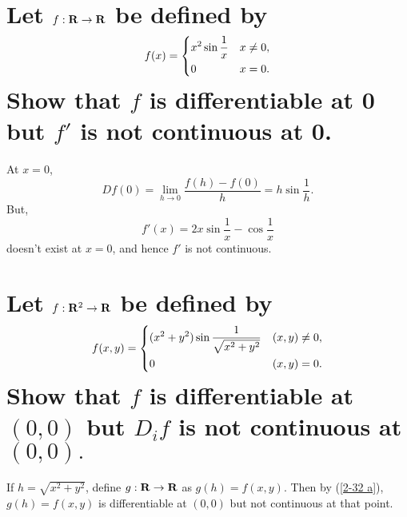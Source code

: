 \question{
    [2-32]
}
\begin{parts}
    \part{
        \label{2-32 a}
        Let $f:\mathbf{R}\to\mathbf{R}$ be defined by
        $$f(x)=
        \begin{dcases}
            x^2\sin{\frac{1}{x}}
                &x\ne 0,\\
            0&x=0.
        \end{dcases}$$
        Show that $f$ is differentiable
        at 0 but $f'$ is not continuous
        at 0. 
    }
    \begin{solution}
    At $x=0$,
    $$Df(0)=\lim_{h\to 0}{\frac
    {f(h)-f(0)}{h}}=
    h\sin{\frac{1}{h}}.$$
    But,
    $$f'(x)=2x\sin{\frac{1}{x}}-\cos{
    \frac{1}{x}}$$
    doesn't exist at $x=0$, and hence
    $f'$ is not continuous.
    \end{solution}

    \part{
        Let $f:\mathbf{R}^2\to\mathbf{R}$ be defined
        by
        $$f(x,y)=\begin{dcases}
            (x^2+y^2)\sin{\dfrac{1}
            {\sqrt{x^2+y^2}}}
            &(x,y)\ne 0,\\
            0&(x,y)=0.
        \end{dcases}$$
        Show that $f$ is differentiable
        at $(0,0)$ but $D_if$ is not
        continuous at $(0,0).$
    }
    \begin{solution}
        If $h=\sqrt{x^2+y^2}$, define
        $g:\mathbf{R}\to\mathbf{R}$ as $g(h)=
        f(x,y)$. Then by (\ref{2-32 a}),
        $g(h)=f(x,y)$ is differentiable
        at $(0,0)$ but not continuous
        at that point.
    \end{solution}
\end{parts}